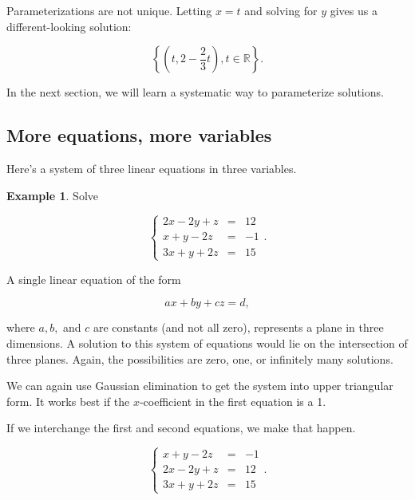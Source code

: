 \documentclass[
]{book}
\theoremstyle{definition}
\theoremstyle{definition}
\newtheorem{example}{Example}[chapter]
\theoremstyle{definition}
\theoremstyle{definition}
\theoremstyle{remark}
\begin{document}
Parameterizations are not unique. Letting \(x=t\) and solving for \(y\) gives us a different-looking solution:

\[\left\{(t,2-\frac{2}{3}t),t\in \mathbb{R}\right\}.\]

In the next section, we will learn a systematic way to parameterize solutions.

\subsection*{More equations, more variables}\label{more-equations-more-variables}

Here's a system of three linear equations in three variables.

\begin{examplebox}

\begin{example}
\protect\hypertarget{exm:tbt}{}\label{exm:tbt}Solve

\begin{equation*}
    \left\{
    \begin{array}{ccl}
    2x-2y+z&=&12\\
    x+y-2z&=&-1\\
    3x+y+2z&=&15 
    \end{array} \right. .
\end{equation*}

A single linear equation of the form

\[ax+by+cz=d,\]

where \(a,b,\) and \(c\) are constants (and not all zero), represents a plane in three dimensions. A solution to this system of equations would lie on the intersection of three planes. Again, the possibilities are zero, one, or infinitely many solutions.

We can again use Gaussian elimination to get the system into upper triangular form. It works best if the \(x\)-coefficient in the first equation is a 1.

If we interchange the first and second equations, we make that happen.

\begin{equation*}
    \left\{
    \begin{array}{ccl}
    x+y-2z&=&-1\\
    2x-2y+z&=&12\\
    3x+y+2z&=&15 
    \end{array} \right. .
\end{equation*}


\end{example}
\end{examplebox}
\end{document}
